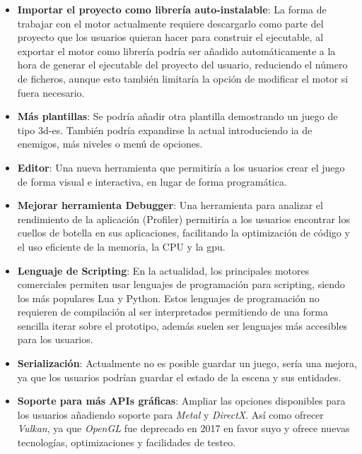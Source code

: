 \begin{itemize}
	\item \textbf{Importar el proyecto como librería auto-instalable}: La forma de trabajar con el motor actualmente
	requiere descargarlo como parte del proyecto que los usuarios quieran hacer para construir el ejecutable, al exportar
    el motor como librería podría ser añadido automáticamente a la hora de generar el ejecutable del proyecto del usuario,
    reduciendo el número de ficheros, aunque esto también limitaría la opción de modificar el motor si fuera necesario.
    \item \textbf{Más plantillas}: Se podría añadir otra plantilla demostrando un juego de tipo \gls{3d-es}. También
    podría expandirse la actual introduciendo \gls{ia} de enemigos, más niveles o menú de opciones.
    \item \textbf{Editor}: Una nueva herramienta que permitiría a los usuarios crear el juego de forma visual e interactiva,
    en lugar de forma programática.
    \item \textbf{Mejorar herramienta Debugger}: Una herramienta para analizar el rendimiento de la aplicación (Profiler)
    permitiría a los usuarios encontrar los cuellos de botella en sus aplicaciones, facilitando la optimización de código
    y el uso eficiente de la memoria, la CPU y la \gls{gpu}.
    \item \textbf{Lenguaje de Scripting}: En la actualidad, los principales motores comerciales permiten usar lenguajes 
    de programación para scripting, siendo los más populares Lua y Python. Estos lenguajes de programación no requieren
    de compilación al ser interpretados permitiendo de una forma sencilla iterar sobre el prototipo, además suelen
    ser lenguajes más accesibles para los usuarios.
    \item \textbf{Serialización}: Actualmente no es posible guardar un juego, sería una mejora, ya que
    los usuarios podrían guardar el estado de la escena y sus entidades.
    \item \textbf{Soporte para más APIs gráficas}: Ampliar las opciones disponibles para los usuarios añadiendo soporte
    para \textit{Metal}\cite{metal} y \textit{DirectX}\cite{direct11}. Así como ofrecer \textit{Vulkan}\cite{vulkan}, ya que \textit{OpenGL} fue deprecado en 2017 en 
    favor suyo y ofrece nuevas tecnologías, optimizaciones y facilidades de testeo.
\end{itemize}
